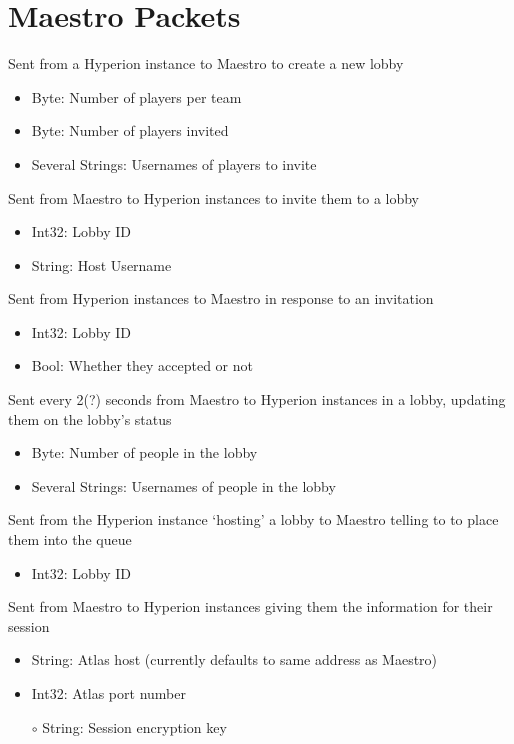 \documentclass[10pt,a4paper]{scrreprt}
\begin{document}
	\section{Maestro Packets}
	\begin{description}[leftmargin=!,labelwidth=0.35\textwidth, itemsep=2ex]
		\item[Create Lobby]
			Sent from a Hyperion instance to Maestro to create a new lobby
			\begin{itemize}
				\item Byte: Number of players per team
				\item Byte: Number of players invited
				\item Several Strings: Usernames of players to invite
			\end{itemize}
		\item[Invite To Lobby]
			Sent from Maestro to Hyperion instances to invite them to a lobby
			\begin{itemize}
				\item Int32: Lobby ID
				\item String: Host Username
			\end{itemize}
		\item[Reply To Lobby Invite]
			Sent from Hyperion instances to Maestro in response to an invitation
			\begin{itemize}
				\item Int32: Lobby ID
				\item Bool: Whether they accepted or not
			\end{itemize}
		\item[Lobby Status]
			Sent every 2(?) seconds from Maestro to Hyperion instances in a lobby, updating them on the lobby's status
			\begin{itemize}
				\item Byte: Number of people in the lobby
				\item Several Strings: Usernames of people in the lobby
			\end{itemize}
		\item[Start Lobby]
			Sent from the Hyperion instance `hosting' a lobby to Maestro telling to to place them into the queue
			\begin{itemize}
				\item Int32: Lobby ID
			\end{itemize}
		\item[Introduce Atlas]
			Sent from Maestro to Hyperion instances giving them the information for their session
			\begin{itemize}
				\item String: Atlas host (currently defaults to same address as Maestro)
				\item Int32: Atlas port number
				\item[$\circ$] String: Session encryption key
			\end{itemize}
	\end{description}
\end{document}
